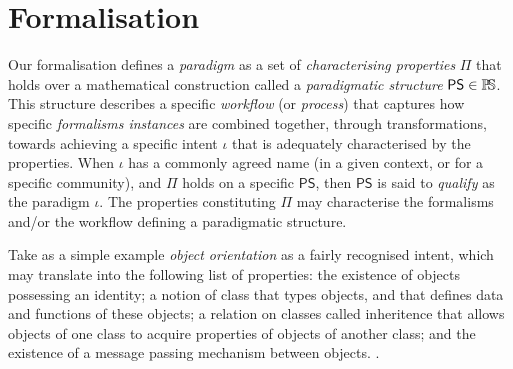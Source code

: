\section{Formalisation}
\label{sec:Formalisation}

Our formalisation defines a \emph{paradigm} as a set of 
\emph{characterising properties} $\mathsf{\Pi}$ that holds over a mathematical 
construction called a \emph{paradigmatic structure} $\mathsf{PS}\in \mathbb{P}\!\mathbb{S}$. 
This structure describes a specific \emph{workflow} (or \emph{process}) that 
captures how specific \emph{formalisms instances} are combined together, 
through transformations, towards achieving a specific intent $\iota$ that is 
adequately characterised by the properties. When $\iota$ has a commonly agreed 
name (in a given context, or for a specific community), and $\mathsf{\Pi}$ holds 
on a specific $\mathsf{PS}$, then $\mathsf{PS}$ is said to \emph{qualify} as 
the paradigm $\iota$. The properties constituting $\mathsf{\Pi}$ may 
characterise the formalisms and/or the workflow defining a paradigmatic 
structure. 

Take as a simple example \emph{object orientation} as a fairly recognised 
intent, which may translate into the following list of properties: the 
existence of objects possessing an identity; a notion of class that types 
objects, and that defines data and functions of these objects; a relation on 
classes called inheritence that allows objects of one class to acquire 
properties of objects of another class; and the existence of a message passing 
mechanism between objects. 
. 

